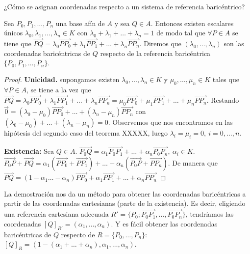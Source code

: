 \documentclass[14pt]{book}
\begin{document}
¿Cómo se asignan coordenadas respecto a un sistema de referencia baricéntrico?

\begin{tm}
	Sea $P_0, P_1, \dots, P_n$ una base afín de $A$ y sea $Q \in A$. Entonces existen escalares únicos $\lambda_0, \lambda_1, \dots, \lambda_n \in K$ con $\lambda_0 + \lambda_1 + \dots + \lambda_n = 1$ de modo tal que $\forall P \in A$ se tiene que $\overrightarrow{PQ} = \lambda_0 \overrightarrow{P P_0} + \lambda_1 \overrightarrow{P P_1}  + \dots + \lambda_n \overrightarrow{P P_n}$. Diremos que $(\lambda_0, \dots, \lambda_n)$ son las coordenadas baricéntricas de $Q$ respecto de la referencia baricéntrica $\{P_0, P_1, \dots, P_n\}$.
\end{tm}

\begin{proof}
	\textbf{Unicidad.} supongamos existen $\lambda_0, \dots, \lambda_n \in K$ y $\mu_0, \dots, \mu_n \in K$ tales que $\forall P \in A$, se tiene a la vez que $\overrightarrow{PQ} = \lambda_0 \overrightarrow{P P_0} + \lambda_1 \overrightarrow{P P_1}  + \dots + \lambda_n \overrightarrow{P P_n} = \mu_0 \overrightarrow{P P_0} + \mu_1 \overrightarrow{P P_1}  + \dots + \mu_n \overrightarrow{P P_n}$. Restando $\overrightarrow{0} = (\lambda_0 - \mu_0)\overrightarrow{P P_0} + \dots + (\lambda_n - \mu_n)\overrightarrow{P P_n}$ con $(\lambda_0 - \mu_0) + \dots + (\lambda_n - \mu_n) = 0$. Observemos que nos encontramos en las hipótesis del segundo caso del teorema XXXXX, luego $\lambda_i = \mu_i = 0,\ i = 0, \dots, n$.
	
	\textbf{Existencia:} Sea $Q \in A$. $\overrightarrow{P_0 Q} = \alpha_1\overrightarrow{P_0 P_1} + \dots + \alpha_n \overrightarrow{P_0 P_n},\ \alpha_i \in K$. $\overrightarrow{P_0 P} + \overrightarrow{PQ} = \alpha_1 (\overrightarrow{P P_0} + \overrightarrow{P P_1}) + \dots + \alpha_n (\overrightarrow{P_0 P} + \overrightarrow{P P_n})$. De manera que $\overrightarrow{P Q} = (1 - \alpha_1 \dots - \alpha_n)\overrightarrow{P P_0} +  \alpha_1 \overrightarrow{P P_1} + \dots  + \alpha_n \overrightarrow{P P_n}$
\end{proof}

La demostración nos da un método para obtener las coordenadas baricéntricas a partir de las coordenadas cartesianas (parte de la existencia). Es decir, eligiendo una referencia cartesiana adecuada $R' = \{P_0; \overrightarrow{P_0 P_1}, \dots, \overrightarrow{P_0 P_n}\}$, tendríamos las coordenadas $[Q]_{R'} = (\alpha_1, \dots, \alpha_n)$. Y es fácil obtener las coordenadas baricéntricas de $Q$ respecto de $R = \{P_0, \dots, P_n\}$: $[Q]_R = (1 - (\alpha_1 + \dots + \alpha_n), \alpha_1, \dots, \alpha_n)$.
\end{document}
